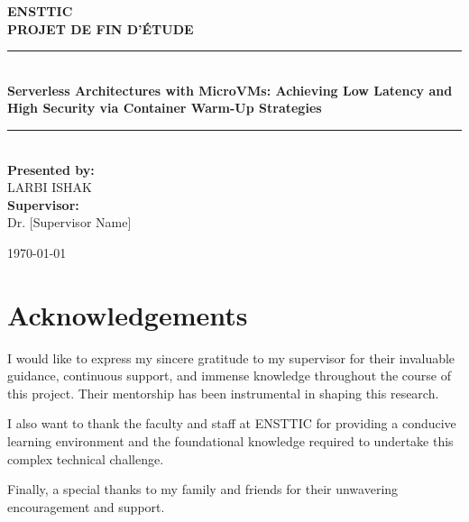 \documentclass[12pt,a4paper]{report}
\begin{document}
\begin{titlepage}
    \centering
    \vspace*{1cm}

    {\Large \textbf{ENSTTIC}}\\[1.5cm]

    {\Large \textbf{PROJET DE FIN D'ÉTUDE}}\\[1cm]

    \rule{\linewidth}{0.5mm} \\[0.4cm]
    {\huge \textbf{Serverless Architectures with MicroVMs: Achieving Low Latency and High Security via Container Warm-Up Strategies}} \\[0.4cm]
    \rule{\linewidth}{0.5mm} \\[1.5cm]

    \textbf{Presented by:}\\
    {\Large LARBI ISHAK}\\[1.5cm]

    \textbf{Supervisor:}\\
    {\Large Dr. [Supervisor Name]}\\[2cm] %

    \vfill

    {\large \today}\\[1cm]
\end{titlepage}


\chapter*{Acknowledgements}
I would like to express my sincere gratitude to my supervisor for their invaluable guidance, continuous support, and immense knowledge throughout the course of this project. Their mentorship has been instrumental in shaping this research.

I also want to thank the faculty and staff at ENSTTIC for providing a conducive learning environment and the foundational knowledge required to undertake this complex technical challenge.

Finally, a special thanks to my family and friends for their unwavering encouragement and support.

\newpage

\end{document}
